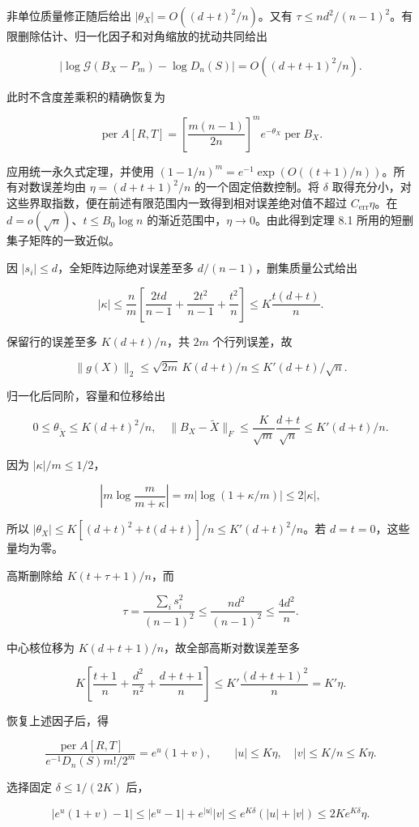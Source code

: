 \documentclass[11pt,a4paper]{article}
\begin{document}
非单位质量修正随后给出 \(|\theta_X|=O((d+t)^2/n)\)。又有 \(\tau\le nd^2/(n-1)^2\)。有限删除估计、归一化因子和对角缩放的扰动共同给出

\[|\log\mathcal G(B_X-P_m)-\log D_n(S)|=O((d+t+1)^2/n).\]

此时不含度差乘积的精确恢复为

\[\operatorname{per}A[R,T]=\left[\frac{m(n-1)}{2n}\right]^m e^{-\theta_X}\operatorname{per}B_X.\]

应用统一永久式定理，并使用 \((1-1/n)^m=e^{-1}\exp(O((t+1)/n))\)。所有对数误差均由 \(\eta=(d+t+1)^2/n\) 的一个固定倍数控制。将 \(\delta\) 取得充分小，对这些界取指数，便在前述有限范围内一致得到相对误差绝对值不超过 \(C_{\mathrm{err}}\eta\)。在 \(d=o(\sqrt n)\)、\(t\le B_0\log n\) 的渐近范围中，\(\eta\to0\)。由此得到定理 8.1 所用的短删集子矩阵的一致近似。

因 \(|s_i|\le d\)，全矩阵边际绝对误差至多 \(d/(n-1)\)，删集质量公式给出

\[|\kappa|\le\frac nm\left[\frac{2td}{n-1}+\frac{2t^2}{n-1}+\frac{t^2}n\right]
\le K\frac{t(d+t)}n.\]

保留行的误差至多 \(K(d+t)/n\)，共 \(2m\) 个行列误差，故

\[\|g(X)\|_2\le\sqrt{2m}\,K(d+t)/n
\le K'(d+t)/\sqrt n.\]

归一化后同阶，容量和位移给出

\[0\le\theta_{\widetilde X}\le K(d+t)^2/n,
\quad
\|B_X-\widetilde X\|_F\le\frac K{\sqrt m}\frac{d+t}{\sqrt n}
\le K'(d+t)/n.\]

因为 \(|\kappa|/m\le1/2\)，

\[\left|m\log\frac m{m+\kappa}\right|
=m|\log(1+\kappa/m)|\le2|\kappa|,\]

所以 \(|\theta_X|\le K[(d+t)^2+t(d+t)]/n\le K'(d+t)^2/n\)。若 \(d=t=0\)，这些量均为零。

高斯删除给 \(K(t+\tau+1)/n\)，而

\[\tau=\frac{\sum_i s_i^2}{(n-1)^2}\le\frac{nd^2}{(n-1)^2}\le\frac{4d^2}n.\]

中心核位移为 \(K(d+t+1)/n\)，故全部高斯对数误差至多

\[K\left[\frac{t+1}n+\frac{d^2}{n^2}+\frac{d+t+1}n\right]
\le K'\frac{(d+t+1)^2}n=K'\eta.\]

恢复上述因子后，得

\[\frac{\operatorname{per}A[R,T]}{e^{-1}D_n(S)m!/2^m}
=e^u(1+v),\qquad |u|\le K\eta,\quad |v|\le K/n\le K\eta.\]

选择固定 \(\delta\le1/(2K)\) 后，

\[|e^u(1+v)-1|
\le|e^u-1|+e^{|u|}|v|
\le e^{K\delta}(|u|+|v|)
\le2Ke^{K\delta}\eta.\]
\end{document}
